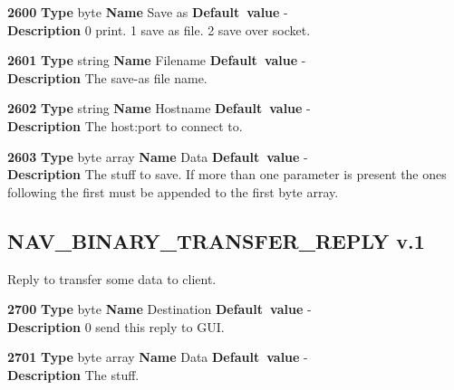 \documentclass[a4paper]{article}
\begin{document}
\begin{list}{\textbf{ParamID}}{}
\item \textbf{2600} \textbf{Type} byte \textbf{Name} Save as
                 \textbf{Default~value} - \\
  \label{Save as}
  \textbf{Description} 0 print. 1 save as file. 2 save over socket.
\item \textbf{2601} \textbf{Type} string \textbf{Name} Filename
                 \textbf{Default~value} - \\
  \label{Filename}
  \textbf{Description} The save-as file name.
\item \textbf{2602} \textbf{Type} string \textbf{Name} Hostname
                 \textbf{Default~value} - \\
  \label{Hostname}
  \textbf{Description} The host:port to connect to.
\item \textbf{2603} \textbf{Type} byte array \textbf{Name} Data
                 \textbf{Default~value} - \\
  \textbf{Description} The stuff to save. If more than one
  parameter is present the ones following the first must be
  appended to the first byte array.
\end{list}
 

\subsection{NAV\_BINARY\_TRANSFER\_REPLY v.1}

Reply to transfer some data to client.

\begin{list}{\textbf{ParamID}}{}
\item \textbf{2700} \textbf{Type} byte \textbf{Name} Destination
                 \textbf{Default~value} - \\
  \label{binary_rep:Destination}
  \textbf{Description} 0 send this reply to GUI.
\item \textbf{2701} \textbf{Type} byte array \textbf{Name} Data
                 \textbf{Default~value} - \\
  \label{binary_rep:Data}
  \textbf{Description} The stuff.
\end{list}
\end{document}
